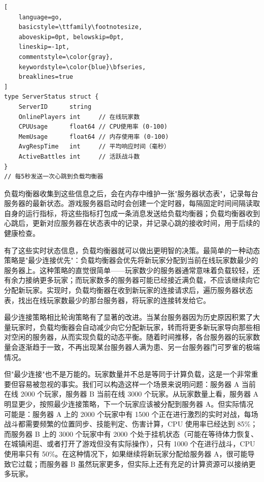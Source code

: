 \begin{tcolorbox}[title=服务器心跳上报的关键数据]
\begin{lstlisting}[
    language=go,
    basicstyle=\ttfamily\footnotesize,
    aboveskip=0pt, belowskip=0pt,
    lineskip=-1pt,
    commentstyle=\color{gray},
    keywordstyle=\color{blue}\bfseries,
    breaklines=true
]
type ServerStatus struct {
    ServerID      string
    OnlinePlayers int     // 在线玩家数
    CPUUsage      float64 // CPU使用率 (0-100)
    MemUsage      float64 // 内存使用率 (0-100)
    AvgRespTime   int     // 平均响应时间（毫秒）
    ActiveBattles int     // 活跃战斗数
}
// 每5秒发送一次心跳到负载均衡器
\end{lstlisting}
\end{tcolorbox}

负载均衡器收集到这些信息之后，会在内存中维护一张"服务器状态表"，记录每台服务器的最新状态。游戏服务器启动时会创建一个定时器，每隔固定时间间隔读取自身的运行指标，将这些指标打包成一条消息发送给负载均衡器；负载均衡器收到心跳后，更新对应服务器在状态表中的记录，并记录心跳的接收时间，用于后续的健康检查。

有了这些实时状态信息，负载均衡器就可以做出更明智的决策。最简单的一种动态策略是"最少连接优先"：负载均衡器会优先将新玩家分配到当前在线玩家数最少的服务器上。这种策略的直觉很简单——玩家数少的服务器通常意味着负载较轻，还有余力接纳更多玩家；而玩家数多的服务器可能已经接近满负载，不应该继续向它分配新玩家。实现时，负载均衡器在收到新玩家的连接请求后，遍历服务器状态表，找出在线玩家数最少的那台服务器，将玩家的连接转发给它。

最少连接策略相比轮询策略有了显著的改进。当某台服务器因为历史原因积累了大量玩家时，负载均衡器会自动减少向它分配新玩家，转而将更多新玩家导向那些相对空闲的服务器，从而实现负载的动态平衡。随着时间推移，各台服务器的玩家数量会逐渐趋于一致，不再出现某台服务器人满为患、另一台服务器门可罗雀的极端情况。

但"最少连接"也不是万能的。玩家数量并不总是等同于计算负载，这是一个非常重要但容易被忽视的事实。我们可以构造这样一个场景来说明问题：服务器 A 当前在线 2000 个玩家，服务器 B 当前在线 3000 个玩家。从玩家数量上看，服务器 A 明显更少，按照最少连接策略，下一个玩家应该被分配到服务器 A。但实际情况可能是：服务器 A 上的 2000 个玩家中有 1500 个正在进行激烈的实时对战，每场战斗都需要频繁的位置同步、技能判定、伤害计算，CPU 使用率已经达到 85\%；而服务器 B 上的 3000 个玩家中有 2000 个处于挂机状态（可能在等待体力恢复、在城镇闲逛、或者打开了游戏但没有实际操作），只有 1000 个在进行战斗，CPU 使用率只有 50\%。在这种情况下，如果继续将新玩家分配给服务器 A，很可能导致它过载；而服务器 B 虽然玩家更多，但实际上还有充足的计算资源可以接纳更多玩家。

